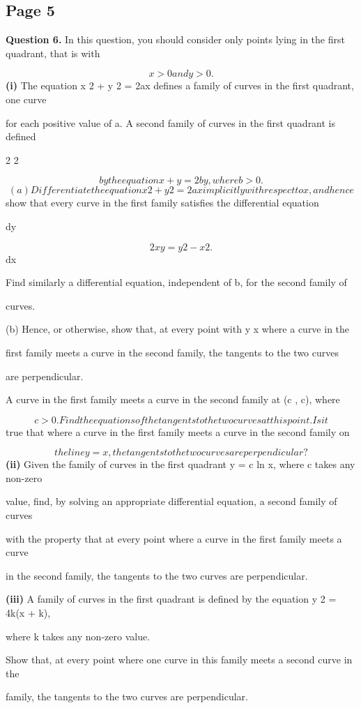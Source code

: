 \documentclass[12pt]{article}
\begin{document}
\subsection*{Page 5}
\begin{flushleft}
\bigskip\textbf{Question 6.} In this question, you should consider only points lying in the first quadrant, that is with\par
\[x > 0 and y > 0.\]
\textbf{(i)} The equation x 2 + y 2 = 2ax defines a family of curves in the first quadrant, one curve\par
for each positive value of a. A second family of curves in the first quadrant is defined\par
2 2\par
\[by the equation x + y = 2by, where b > 0.\]
\[(a) Differentiate the equation x 2 + y 2 = 2ax implicitly with respect to x, and hence\]
show that every curve in the first family satisfies the differential equation\par
dy\par
\[2xy = y 2 - x 2 .\]
dx\par
Find similarly a differential equation, independent of b, for the second family of\par
curves.\par
(b) Hence, or otherwise, show that, at every point with y \ne x where a curve in the\par
first family meets a curve in the second family, the tangents to the two curves\par
are perpendicular.\par
A curve in the first family meets a curve in the second family at (c , c), where\par
\[c > 0. Find the equations of the tangents to the two curves at this point. Is it\]
true that where a curve in the first family meets a curve in the second family on\par
\[the line y = x, the tangents to the two curves are perpendicular?\]
\textbf{(ii)} Given the family of curves in the first quadrant y = c ln x, where c takes any non-zero\par
value, find, by solving an appropriate differential equation, a second family of curves\par
with the property that at every point where a curve in the first family meets a curve\par
in the second family, the tangents to the two curves are perpendicular.\par
\textbf{(iii)} A family of curves in the first quadrant is defined by the equation y 2 = 4k(x + k),\par
where k takes any non-zero value.\par
Show that, at every point where one curve in this family meets a second curve in the\par
family, the tangents to the two curves are perpendicular.\par
\end{flushleft}
\end{document}

